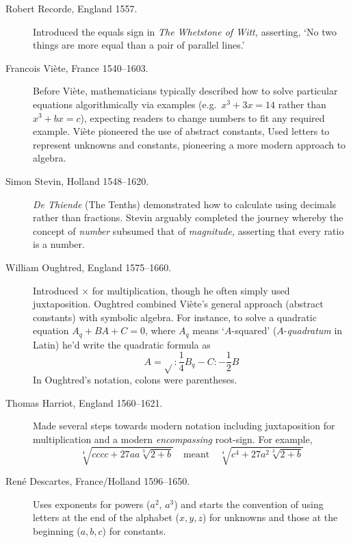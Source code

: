\begin{description}
	\item[Robert Recorde, England 1557.] Introduced the equals sign in \emph{The Whetstone of Witt,}	asserting, `No two things are more equal than a pair of parallel lines.'
	
	\item[Francois Viète, France 1540--1603.] Before Viète, mathematicians typically described how to solve particular equations algorithmically via examples (e.g.\ $x^3+3x=14$ rather than $x^3+bx=c$), expecting readers to change numbers to fit any required example. Viète pioneered the use of abstract constants, Used letters to represent unknowns and constants, pioneering a more modern approach to algebra.
	
	\item[Simon Stevin, Holland 1548--1620.] \emph{De Thiende} (The Tenths) demonstrated how to calculate using decimals rather than fractions. Stevin arguably completed the journey whereby the concept of \emph{number} subsumed that of \emph{magnitude,} asserting that every ratio is a number.
	
	
	\item[William Oughtred, England 1575--1660.] Introduced $\times$ for multiplication, though he often simply used juxtaposition. Oughtred combined Viète's general approach (abstract constants) with symbolic algebra. For instance, to solve a quadratic equation $A_q+BA+C=0$, where $A_q$ means `$A$-squared'  ($A$-\emph{quadratum} in Latin) he'd write the quadratic formula as
	\[A=\sqrt{} :\frac 14B_q-C:-\frac 12B\]
	In Oughtred's notation, colons were parentheses.
	
	\item[Thomas Harriot, England 1560--1621.] Made several steps towards modern notation including juxtaposition for multiplication and a modern \emph{encompassing} root-sign. For example, 
	\[\sqrt[4]{cccc+27aa\sqrt[3]{2+b}}\quad\text{meant}\quad \sqrt[4]{c^4+27a^2\sqrt[3]{2+b}}\]
	
	\item[René Descartes, France/Holland 1596--1650.] Uses exponents for powers ($a^2$, $a^3$) and starts the convention of using letters at the end of the alphabet ($x,y,z$) for unknowns and those at the beginning ($a,b,c$) for constants.
\end{description}


